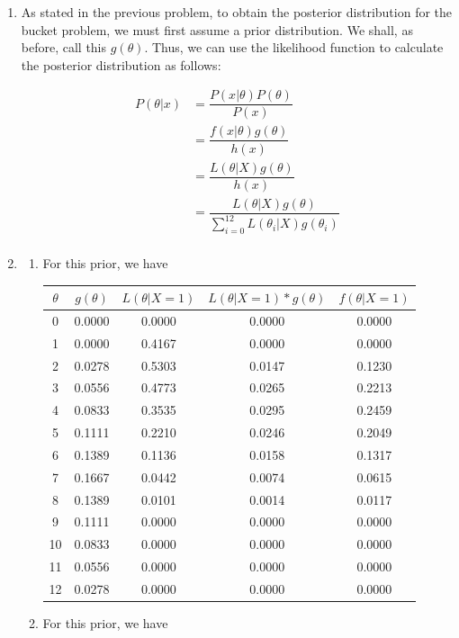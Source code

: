 \documentclass[12pt]{article}\usepackage[]{graphicx}\usepackage[]{color}
\begin{document}
\begin{enumerate}
\item As stated in the previous problem, to obtain the posterior distribution for the bucket problem, we must first assume a prior distribution. We shall, as before, call this $g(\theta)$. Thus, we can use the likelihood function to calculate the posterior distribution as follows:

\begin{align*}
P(\theta | x) &= \dfrac{P(x|\theta) P(\theta) }{P(x)}\\
&= \dfrac{f(x|\theta) g(\theta) }{h(x)}\\
&= \dfrac{L(\theta|X) g(\theta) }{h(x)}\\
&= \dfrac{L(\theta|X) g(\theta) }{\sum_{i=0}^{12} L(\theta_i|X) g(\theta_i)}\\
\end{align*}
\newpage
\item 
\begin{enumerate}[label=(\alph*)]
\item For this prior, we have
\begin{table}[ht]
\centering
\begin{tabular}{ccccc}
  \hline
$\theta$ & $g(\theta)$ & $L(\theta | X=1)$  & $L(\theta | X=1) * g(\theta)$ & $f(\theta | X=1)$ \\ 
  \hline
0 & 0.0000 & 0.0000 & 0.0000 & 0.0000 \\ 
1 & 0.0000 & 0.4167 & 0.0000 & 0.0000 \\ 
2 & 0.0278 & 0.5303 & 0.0147 & 0.1230 \\ 
3 & 0.0556 & 0.4773 & 0.0265 & 0.2213 \\ 
4 & 0.0833 & 0.3535 & 0.0295 & 0.2459 \\ 
5 & 0.1111 & 0.2210 & 0.0246 & 0.2049 \\ 
6 & 0.1389 & 0.1136 & 0.0158 & 0.1317 \\ 
7 & 0.1667 & 0.0442 & 0.0074 & 0.0615 \\ 
8 & 0.1389 & 0.0101 & 0.0014 & 0.0117 \\ 
9 & 0.1111 & 0.0000 & 0.0000 & 0.0000 \\ 
10 & 0.0833 & 0.0000 & 0.0000 & 0.0000 \\ 
11 & 0.0556 & 0.0000 & 0.0000 & 0.0000 \\ 
12 & 0.0278 & 0.0000 & 0.0000 & 0.0000 \\ 
   \hline
\end{tabular}
\end{table}

\item For this prior, we have


\end{enumerate}
\end{enumerate}
\end{document}
